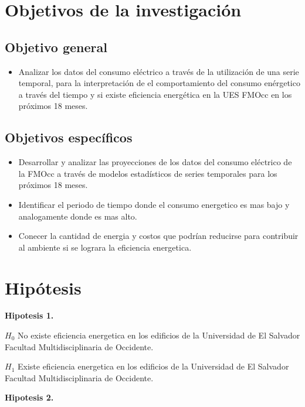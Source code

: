 \documentclass[12pt,letterpaper]{report}
\begin{document}
\newpage
\section{Objetivos de la investigación}
\subsection{Objetivo general}

\begin{itemize}
\item Analizar los datos del consumo eléctrico a través de la utilización de una serie
temporal, para la interpretación de el comportamiento del consumo enérgetico a través del tiempo y si existe eficiencia energética en la UES FMOcc en los próximos 18 meses.
\end{itemize}

\subsection{Objetivos específicos}

\begin{itemize}
\item Desarrollar y analizar las proyecciones de los datos del consumo eléctrico de la
FMOcc a través de modelos estadísticos de series temporales para los próximos 18
meses.

\item Identificar el periodo de tiempo donde el consumo energetico es mas bajo y analogamente donde es mas alto.

\item Conecer la cantidad de energia y costos que podrían reducirse para contribuir al ambiente si se lograra la eficiencia energetica.  

\end{itemize}

\newpage
\section{Hipótesis}
\textbf{ Hipotesis 1.} 

$H_0$ No existe eficiencia energetica en los edificios de la Universidad de El Salvador Facultad Multidisciplinaria de Occidente.

$H_1$ Existe eficiencia energetica en los edificios de la Universidad de El Salvador Facultad Multidisciplinaria de Occidente.

\textbf{ Hipotesis 2.}
\end{document}
